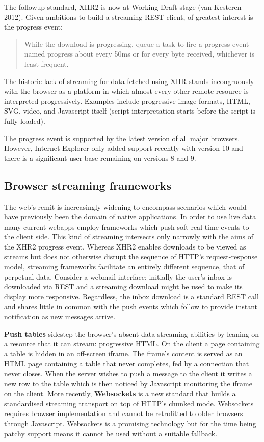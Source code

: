 \documentclass[12pt, ]{article}
\begin{document}
The followup standard, XHR2 is now at Working Draft stage (van Kesteren
2012). Given ambitions to build a streaming REST client, of greatest
interest is the progress event:

\begin{quote}
While the download is progressing, queue a task to fire a progress event
named progress about every 50ms or for every byte received, whichever is
least frequent.
\end{quote}

The historic lack of streaming for data fetched using XHR stands
incongruously with the browser as a platform in which almost every other
remote resource is interpreted progressively. Examples include
progressive image formats, HTML, SVG, video, and Javascript itself
(script interpretation starts before the script is fully loaded).

The progress event is supported by the latest version of all major
browsers. However, Internet Explorer only added support recently with
version 10 and there is a significant user base remaining on versions 8
and 9.

\subsection{Browser streaming
frameworks}\label{browser-streaming-frameworks}

\label{browserstreamingframeworks}

The web's remit is increasingly widening to encompass scenarios which
would have previously been the domain of native applications. In order
to use live data many current webapps employ frameworks which push
soft-real-time events to the client side. This kind of streaming
intersects only narrowly with the aims of the XHR2 progress event.
Whereas XHR2 enables downloads to be viewed as streams but does not
otherwise disrupt the sequence of HTTP's request-response model,
streaming frameworks facilitate an entirely different sequence, that of
perpetual data. Consider a webmail interface; initially the user's inbox
is downloaded via REST and a streaming download might be used to make
its display more responsive. Regardless, the inbox download is a
standard REST call and shares little in common with the push events
which follow to provide instant notification as new messages arrive.

\textbf{Push tables} sidestep the browser's absent data streaming
abilities by leaning on a resource that it can stream: progressive HTML.
On the client a page containing a table is hidden in an off-screen
iframe. The frame's content is served as an HTML page containing a table
that never completes, fed by a connection that never closes. When the
server wishes to push a message to the client it writes a new row to the
table which is then noticed by Javascript monitoring the iframe on the
client. More recently, \textbf{Websockets} is a new standard that builds
a standardised streaming transport on top of HTTP's chunked mode.
Websockets requires browser implementation and cannot be retrofitted to
older browsers through Javascript. Websockets is a promising technology
but for the time being patchy support means it cannot be used without a
suitable fallback.
\end{document}
